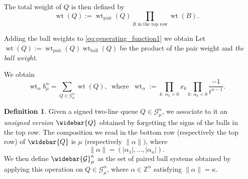 \documentclass[12pt]{amsart}
\theoremstyle{definition}
\newtheorem{definition}[thm]{Definition}
\DeclareMathOperator{\wt}{wt}
\DeclareMathOperator{\ball}{ball}
\DeclareMathOperator{\pair}{pair}
\newcommand{\ZZ}{\mathbb Z}
\newcommand{\mcG}{\mathcal{G}}
\newcommand{\Gbar}{\widebar{\mathcal{G}}}
\newcommand{\Qbar}{\widebar{Q}}
\begin{document}
The total weight of $Q$ is then defined by 
$$\wt(Q):=\wt_{\pair}(Q)\prod_{B \text{ in the top row}}\wt(B).$$

Adding the ball weights to \cref{eq:generating_function1} we obtain 
\fi
Let $\wt(Q):=\wt_{\pair}(Q)\wt_{\ball}(Q)$ be the product of the pair weight and \emph{the ball weight}.

We obtain
\begin{equation}\label{eq:generating_function2}
    \wt_\alpha b_\mu^\alpha=\sum_{Q\in\mcG_\mu^\alpha}\wt(Q),
    \ \text{ where } \ 
  \wt_\alpha:=\prod_{k:\,\alpha_k>0}x_k  \prod_{k:\, \alpha_k<0}\frac{-1}{t^{n-1}}.
\end{equation}




\begin{definition}\label{def:Gbar}
Given a signed two-line queue $Q\in \mcG^\alpha_{\mu}$, we associate to it an \emph{unsigned version} $\Qbar$ obtained by forgetting the signs of the balls in the top row. The composition we read in the bottom row (respectively the top row) of $\Qbar$ is $\mu$ (respectively $\lVert \alpha\rVert)$, where 
$$\lVert \alpha\rVert=(|\alpha_1|,\dots,|\alpha_n|).$$
We then define $\Gbar_\mu^{\kappa}$ as the set of paired ball systems obtained by applying this operation on $Q\in \mcG^\alpha_\mu$, where $\alpha\in \ZZ^n$ satisfying $\lVert\alpha\rVert=\kappa$.
\end{definition}
\end{document}
